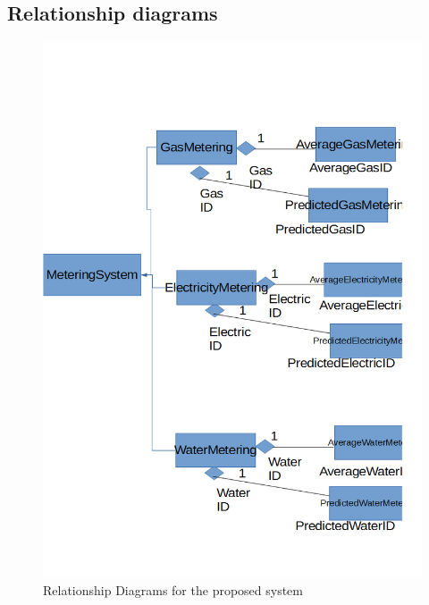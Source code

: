 \subsection{Relationship diagrams}
\begin{figure}[H]
    \includegraphics[width=\textwidth]{./Relationships.png}
    \caption{Relationship Diagrams for the proposed system} \label{fig:Relationship Diagrams}
\end{figure}
